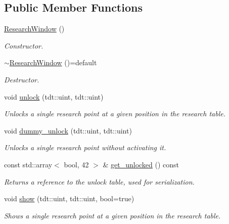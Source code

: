 \subsection*{Public Member Functions}
\begin{DoxyCompactItemize}
\item 
\hyperlink{class_research_window_a269831a5df51bf25aa58a808aa90d8dd}{Research\+Window} ()
\begin{DoxyCompactList}\small\item\em Constructor. \end{DoxyCompactList}\item 
\hyperlink{class_research_window_a6bab33e0158b5084b5dfd4829505bdae}{$\sim$\+Research\+Window} ()=default
\begin{DoxyCompactList}\small\item\em Destructor. \end{DoxyCompactList}\item 
void \hyperlink{class_research_window_a72fc4f35e0edcf7a806b8d756d6ef6fa}{unlock} (tdt\+::uint, tdt\+::uint)
\begin{DoxyCompactList}\small\item\em Unlocks a single research point at a given position in the research table. \end{DoxyCompactList}\item 
void \hyperlink{class_research_window_a6c77d878fea0275317a1d6fca0a43208}{dummy\+\_\+unlock} (tdt\+::uint, tdt\+::uint)
\begin{DoxyCompactList}\small\item\em Unlocks a single research point without activating it. \end{DoxyCompactList}\item 
const std\+::array$<$ bool, 42 $>$ \& \hyperlink{class_research_window_a6e75e6eba35907b8f5b08c8a8d1185fc}{get\+\_\+unlocked} () const 
\begin{DoxyCompactList}\small\item\em Returns a reference to the unlock table, used for serialization. \end{DoxyCompactList}\item 
void \hyperlink{class_research_window_a52c1497a959cadc2ea2ccc99e38149bd}{show} (tdt\+::uint, tdt\+::uint, bool=true)
\begin{DoxyCompactList}\small\item\em Shows a single research point at a given position in the research table. \end{DoxyCompactList}\item 

\end{DoxyCompactItemize}
